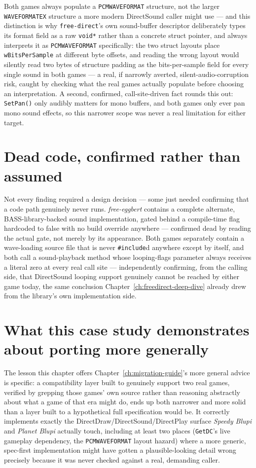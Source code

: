 Both games always populate a \texttt{PCMWAVEFORMAT} structure, not the larger
\texttt{WAVEFORMATEX} structure a more modern DirectSound caller might use --- and this
distinction is why \texttt{free-direct}'s own sound-buffer descriptor deliberately types its
format field as a raw \texttt{void*} rather than a concrete struct pointer, and always
interprets it as \texttt{PCMWAVEFORMAT} specifically: the two struct layouts place
\texttt{wBitsPerSample} at different byte offsets, and reading the wrong layout would silently
read two bytes of structure padding as the bits-per-sample field for every single sound in
both games --- a real, if narrowly averted, silent-audio-corruption risk, caught by checking
what the real games actually populate before choosing an interpretation. A second, confirmed,
call-site-driven fact rounds this out: \texttt{SetPan()} only audibly matters for mono
buffers, and both games only ever pan mono sound effects, so this narrower scope was never a
real limitation for either target.

\section{Dead code, confirmed rather than assumed}

Not every finding required a design decision --- some just needed confirming that a code path
genuinely never runs. \emph{free-eggbert} contains a complete alternate, BASS-library-backed
sound implementation, gated behind a compile-time flag hardcoded to false with no build
override anywhere --- confirmed dead by reading the actual gate, not merely by its
appearance. Both games separately contain a wave-loading source file that is never
\texttt{\#include}d anywhere except by itself, and both call a sound-playback method whose
looping-flags parameter always receives a literal zero at every real call site --- independently
confirming, from the calling side, that DirectSound looping support genuinely cannot be
reached by either game today, the same conclusion Chapter~\ref{ch:freedirect-deep-dive}
already drew from the library's own implementation side.

\section{What this case study demonstrates about porting more generally}

The lesson this chapter offers Chapter~\ref{ch:migration-guide}'s more general advice is
specific: a compatibility layer built to genuinely support two real games, verified by
grepping those games' own source rather than reasoning abstractly about what a game of that
era might do, ends up both narrower and more solid than a layer built to a hypothetical full
specification would be. It correctly implements exactly the DirectDraw/DirectSound/DirectPlay
surface \emph{Speedy Blupi} and \emph{Planet Blupi} actually touch, including at least two
places (\texttt{GetDC}'s live gameplay dependency, the \texttt{PCMWAVEFORMAT} layout hazard)
where a more generic, spec-first implementation might have gotten a plausible-looking detail
wrong precisely because it was never checked against a real, demanding caller.
